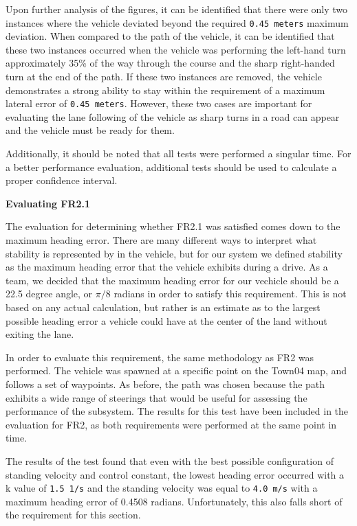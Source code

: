 \documentclass[titlepage,draft]{article}
\begin{document}
{Upon further analysis of the figures, it can be identified that there were only two instances where the vehicle deviated beyond the required \texttt{0.45 meters} maximum deviation. When compared to the path of the vehicle, it can be identified that these two instances occurred when the vehicle was performing the left-hand turn approximately 35\% of the way through the course and the sharp right-handed turn at the end of the path. If these two instances are removed, the vehicle demonstrates a strong ability to stay within the requirement of a maximum lateral error of \texttt{0.45 meters}. However, these two cases are important for evaluating the lane following of the vehicle as sharp turns in a road can appear and the vehicle must be ready for them.

Additionally, it should be noted that all tests were performed a singular time. For a better performance evaluation, additional tests should be used to calculate a proper confidence interval.

\textbf{Evaluating FR2.1}

The evaluation for determining whether FR2.1 was satisfied comes down to the maximum heading error. There are many different ways to interpret what stability is represented by in the vehicle, but for our system we defined stability as the maximum heading error that the vehicle exhibits during a drive. As a team, we decided that the maximum heading error for our vechicle should be a 22.5 degree angle, or \(\pi/8\) radians in order to satisfy this requirement. This is not based on any actual calculation, but rather is an estimate as to the largest possible heading error a vehicle could have at the center of the land without exiting the lane.

In order to evaluate this requirement, the same methodology as FR2 was performed. The vehicle was spawned at a specific point on the Town04 map, and follows a set of waypoints. As before, the path was chosen because the path exhibits a wide range of steerings that would be useful for assessing the performance of the subsystem. The results for this test have been included in the evaluation for FR2, as both requirements were performed at the same point in time.

The results of the test found that even with the best possible configuration of standing velocity and control constant, the lowest heading error occurred with a k value of \texttt{1.5 1/s} and the standing velocity was equal to \texttt{4.0 m/s} with a maximum heading error of 0.4508 radians. Unfortunately, this also falls short of the requirement for this section.

}
\end{document}
